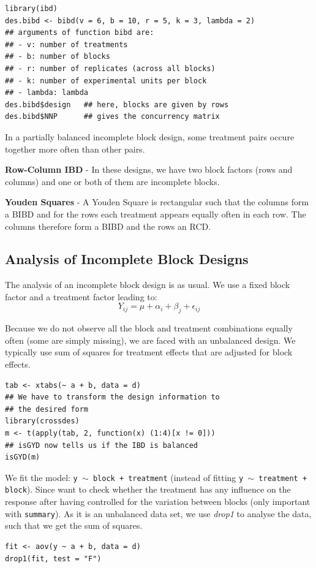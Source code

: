 \begin{lstlisting}
library(ibd)
des.bibd <- bibd(v = 6, b = 10, r = 5, k = 3, lambda = 2) 
## arguments of function bibd are:
## - v: number of treatments
## - b: number of blocks
## - r: number of replicates (across all blocks)
## - k: number of experimental units per block
## - lambda: lambda
des.bibd$design   ## here, blocks are given by rows
des.bibd$NNP      ## gives the concurrency matrix
\end{lstlisting}

In a partially balanced incomplete block design, some treatment pairs occure together more often than other pairs.\medskip

\textbf{Row-Column IBD} - In these designs, we have two block factors (rows and columns) and one or both of them are incomplete blocks. \medskip

\textbf{Youden Squares} - A Youden Square is rectangular such that the columns form a BIBD and for the rows each treatment appears equally often in each row. The columns therefore form a BIBD and the rows an RCD.


\subsection{Analysis of Incomplete Block Designs} 

The analysis of an incomplete block design is as usual. We use a fixed block factor and a treatment factor leading to:
$$Y_{ij} = \mu + \alpha_i + \beta_j + \epsilon_{ij}$$

Because we do not observe all the block and treatment combinations equally often (some are simply missing), we are faced with an unbalanced design. We typically use sum of squares for treatment effects that are adjusted for block effects.

\begin{lstlisting}
tab <- xtabs(~ a + b, data = d)
## We have to transform the design information to 
## the desired form
library(crossdes)
m <- t(apply(tab, 2, function(x) (1:4)[x != 0]))
## isGYD now tells us if the IBD is balanced
isGYD(m)
\end{lstlisting}

We fit the model: \texttt{y $\sim$ block + treatment} (instead of fitting \texttt{y $\sim$ treatment + block}). Since want to check whether the treatment has any influence on the response after having controlled for the variation between blocks (only important with \texttt{summary}).
As it is an unbalanced data set, we use \textit{drop1} to analyse the data, such that we get the sum of squares.
\begin{lstlisting}
fit <- aov(y ~ a + b, data = d)
drop1(fit, test = "F")
\end{lstlisting}


